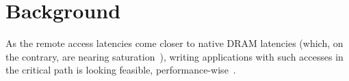 \section{Background}
\label{sec:background}

As the remote access latencies come closer to native 
DRAM latencies (which, on the contrary, 
are nearing saturation~\cite{Aguilera2017}),
writing applications with such accesses 
in the critical path is looking feasible, 
performance-wise~\cite{netdisagg}. 
